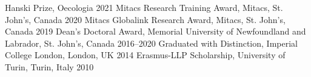
\begin{cvhonors}

  \mycvhonor
    {Hanski Prize,} %
    {Oecologia} %
    {2021} %
  \mycvhonor
    {Mitacs Research Training Award,} %
    {Mitacs, St. John's, Canada} %
    {2020} %
  \mycvhonor
    {Mitacs Globalink Research Award,} %
    {Mitacs, St. John's, Canada} %
    {2019} %
  \mycvhonor
    {Dean's Doctoral Award,} %
    {Memorial University of Newfoundland and Labrador, St. John's, Canada} %
    {2016--2020} %
  \mycvhonor
    {Graduated with Distinction,} %
    {Imperial College London, London, UK} %
    {2014} %
  \mycvhonor
    {Erasmus-LLP Scholarship,} %
    {University of Turin, Turin, Italy} %
    {2010} %
\end{cvhonors}